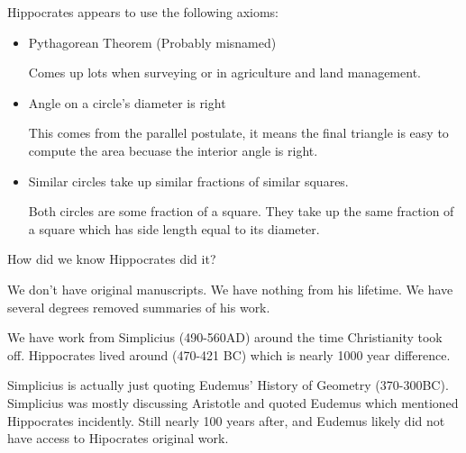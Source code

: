 \documentclass{report}
\begin{document}
\begin{description}
\begin{mdframed}
            Hippocrates appears to use the following axioms:
            \begin{itemize}
                \item Pythagorean Theorem (Probably misnamed)
                    \begin{mdframed}
                        Comes up lots when surveying or 
                        in agriculture and land management.
                    \end{mdframed}
                \item Angle on a circle's diameter is
                    right
                    \begin{mdframed}
                        This comes from the parallel postulate,
                        it means the final triangle is
                        easy to compute the area becuase
                        the interior angle is right.
                    \end{mdframed}
                \item Similar circles take up similar fractions
                    of similar squares.
                    \begin{mdframed}
                        Both circles are some fraction
                        of a square. They take up the same
                        fraction of a square which has side
                        length equal to its diameter.
                    \end{mdframed}
            \end{itemize}
        \end{mdframed}
    \item  {\large How did we know Hippocrates did it?}
        \begin{mdframed}
           We don't have original manuscripts. 
           We have nothing from his lifetime.
           We have several degrees removed summaries of
           his work.

           We have work from Simplicius (490-560AD) around the
           time Christianity took off. Hippocrates lived
           around (470-421 BC) which is nearly 1000 year
           difference.

           Simplicius is actually just quoting Eudemus'
           History of Geometry (370-300BC). Simplicius was
           mostly discussing Aristotle and quoted Eudemus
           which mentioned Hippocrates incidently. Still
           nearly 100 years after, and Eudemus likely did not
           have access to Hipocrates original work.


\end{mdframed}
\end{description}
\end{document}
